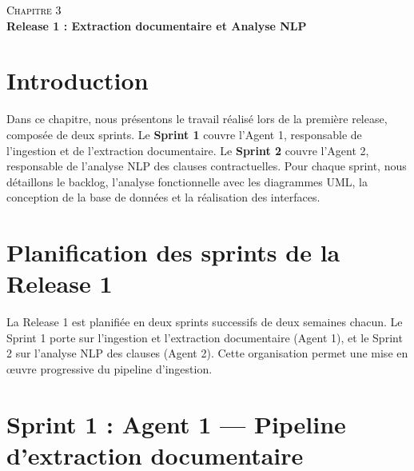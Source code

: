 \setcounter{chapter}{3}
\setcounter{section}{0}
\setcounter{figure}{0}
\setcounter{table}{0}

\thispagestyle{empty}
\begin{center}
    \vspace*{\fill}
    {\fontsize{40pt}{48pt}\selectfont \textcolor{black}{\textsc{Chapitre 3}}}\\[2em]
    {\fontsize{22pt}{26pt}\selectfont \textbf{Release 1 : Extraction documentaire et Analyse NLP}}
    \vspace*{\fill}
\end{center}
\newpage
{}

\section{Introduction}

Dans ce chapitre, nous présentons le travail réalisé lors de la première release, composée de deux sprints. Le \textbf{Sprint 1} couvre l'Agent 1, responsable de l'ingestion et de l'extraction documentaire. Le \textbf{Sprint 2} couvre l'Agent 2, responsable de l'analyse NLP des clauses contractuelles. Pour chaque sprint, nous détaillons le backlog, l'analyse fonctionnelle avec les diagrammes UML, la conception de la base de données et la réalisation des interfaces.

\section{Planification des sprints de la Release 1}

La Release 1 est planifiée en deux sprints successifs de deux semaines chacun.
Le Sprint 1 porte sur l'ingestion et l'extraction documentaire (Agent 1),
et le Sprint 2 sur l'analyse NLP des clauses (Agent 2).
Cette organisation permet une mise en œuvre progressive du pipeline d'ingestion.

\section{Sprint 1 : Agent 1 — Pipeline d'extraction documentaire}

